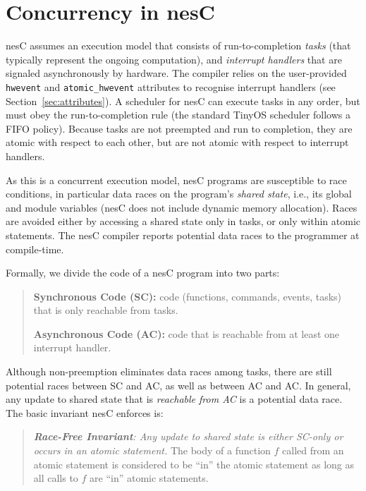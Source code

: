 \documentclass[11pt,letterpaper]{article}
\newcommand{\code}[1]{{\tt #1}}
\newcommand{\nesc}{nesC\xspace}
\newcommand{\tinyos}{TinyOS\xspace}
\begin{document}
\section{Concurrency in \nesc}
\label{sec:concurrency}

\nesc assumes an execution model that consists of run-to-completion
\emph{tasks} (that typically represent the ongoing computation), and
\emph{interrupt handlers} that are signaled asynchronously by hardware. The
compiler relies on the user-provided \code{hwevent} and
\code{atomic\_hwevent} attributes to recognise interrupt handlers (see
Section~\ref{sec:attributes}).  A scheduler for \nesc can execute tasks in
any order, but must obey the run-to-completion rule (the standard \tinyos
scheduler follows a FIFO policy). Because tasks are not preempted and run
to completion, they are atomic with respect to each other, but are not
atomic with respect to interrupt handlers.

As this is a concurrent execution model, \nesc programs are susceptible to
race conditions, in particular data races on the program's \emph{shared
state}, i.e., its global and module variables (\nesc does not include
dynamic memory allocation). Races are avoided either by accessing a
shared state only in tasks, or only within atomic statements. The \nesc
compiler reports potential data races to the programmer at compile-time.

Formally, we divide the code of a \nesc program into two parts:
\begin{quote}
\textbf{Synchronous Code (SC):} code (functions, commands, events, tasks)
that is only reachable from tasks.

\textbf{Asynchronous Code (AC):} code that is reachable from at 
least one interrupt handler.
\end{quote}

Although non-preemption eliminates data races among tasks, there are still
potential races between SC and AC, as well as between AC and AC.  In
general, any update to shared state that is {\em reachable from AC} is a
potential data race.  The basic invariant \nesc enforces is:
\begin{quote}
{\sl {\bf Race-Free Invariant}: Any update to shared state is either
SC-only or occurs in an atomic statement.} The body of a function $f$
called from an atomic statement is considered to be ``in'' the atomic
statement as long as all calls to $f$ are ``in'' atomic statements.
\end{quote}
\end{document}
